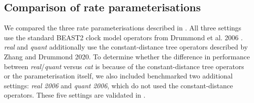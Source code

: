 \documentclass[10pt,letterpaper]{article}
\begin{document}
\subsection*{Comparison of rate parameterisations}

We compared the three rate parameterisations described in \textbf{}. All three settings use the standard BEAST2 clock model operators from Drummond et al. 2006 \cite{drummond2006relaxed}. \textit{real} and \textit{quant} additionally use the constant-distance tree operators described by Zhang and Drummond 2020. To determine whether the difference in performance between \textit{real}/\textit{quant} versus \textit{cat} is because of the constant-distance tree operators or the parameterisation itself, we also included benchmarked two additional settings: \textit{real 2006} and \textit{quant 2006}, which do not used the constant-distance operators. These five settings are validated in \textbf{}.







\end{document}
